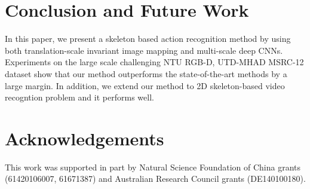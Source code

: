 \documentclass[10pt,journal]{IEEEtran}
\begin{document}
\section{Conclusion and Future Work}
In this paper, we present a skeleton based action recognition method by using both translation-scale invariant image mapping and multi-scale deep CNNs. Experiments on the large scale challenging NTU RGB-D, UTD-MHAD MSRC-12 dataset show that our method outperforms the state-of-the-art methods by a large margin. In addition, we extend our method to 2D skeleton-based video recogntion problem and it performs well. 




\section*{Acknowledgements}
This work was supported in part by Natural Science Foundation of China grants (61420106007, 61671387) and Australian Research Council grants (DE140100180).


\end{document}
